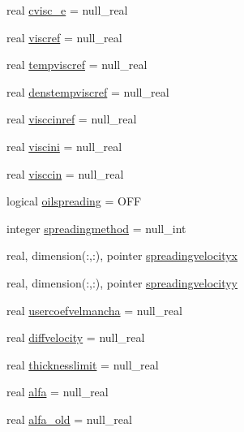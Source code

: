 \begin{DoxyCompactItemize}
\item 
real \mbox{\hyperlink{structmoduleoil_1_1t__var_a86683aedb88d60300c421b6bff528a9f}{cvisc\+\_\+e}} = null\+\_\+real
\item 
real \mbox{\hyperlink{structmoduleoil_1_1t__var_a4714035bc5df6412fb12682b398c12d2}{viscref}} = null\+\_\+real
\item 
real \mbox{\hyperlink{structmoduleoil_1_1t__var_aa9c38ac493f33f921810c2bfb764f693}{tempviscref}} = null\+\_\+real
\item 
real \mbox{\hyperlink{structmoduleoil_1_1t__var_a4be9f424a7f077adecaf5ea45b3531c6}{denstempviscref}} = null\+\_\+real
\item 
real \mbox{\hyperlink{structmoduleoil_1_1t__var_a3202785ad7ecc8e792f27a141ab0acce}{visccinref}} = null\+\_\+real
\item 
real \mbox{\hyperlink{structmoduleoil_1_1t__var_ab4c0e2711611037a5b3fbeacb80ff323}{viscini}} = null\+\_\+real
\item 
real \mbox{\hyperlink{structmoduleoil_1_1t__var_a4eb640536877e6b0a6bc430e9254c279}{visccin}} = null\+\_\+real
\item 
logical \mbox{\hyperlink{structmoduleoil_1_1t__var_af6c70bc0c48d31b76bb153df60a44fab}{oilspreading}} = O\+FF
\item 
integer \mbox{\hyperlink{structmoduleoil_1_1t__var_ac55776c38b41f8c3b9ab19fd21fe6135}{spreadingmethod}} = null\+\_\+int
\item 
real, dimension(\+:,\+:), pointer \mbox{\hyperlink{structmoduleoil_1_1t__var_acc06c016cde1717b9cdfadd72f3f60f2}{spreadingvelocityx}}
\item 
real, dimension(\+:,\+:), pointer \mbox{\hyperlink{structmoduleoil_1_1t__var_ad5bdfa8cc45735e64d7a3f4b3f33e698}{spreadingvelocityy}}
\item 
real \mbox{\hyperlink{structmoduleoil_1_1t__var_a88db923f60505f2916878cd6418f6e60}{usercoefvelmancha}} = null\+\_\+real
\item 
real \mbox{\hyperlink{structmoduleoil_1_1t__var_a97f2b5e0e2d4d79a0d7effbf99b16a3b}{diffvelocity}} = null\+\_\+real
\item 
real \mbox{\hyperlink{structmoduleoil_1_1t__var_a061d6400b029d08d0ebdfd28ebbf9c98}{thicknesslimit}} = null\+\_\+real
\item 
real \mbox{\hyperlink{structmoduleoil_1_1t__var_a38597ca805d75600f67d820d181d45c3}{alfa}} = null\+\_\+real
\item 
real \mbox{\hyperlink{structmoduleoil_1_1t__var_a4f5a3c35900ad5dfa2cfb2f2f8c6d12a}{alfa\+\_\+old}} = null\+\_\+real

\end{DoxyCompactItemize}
